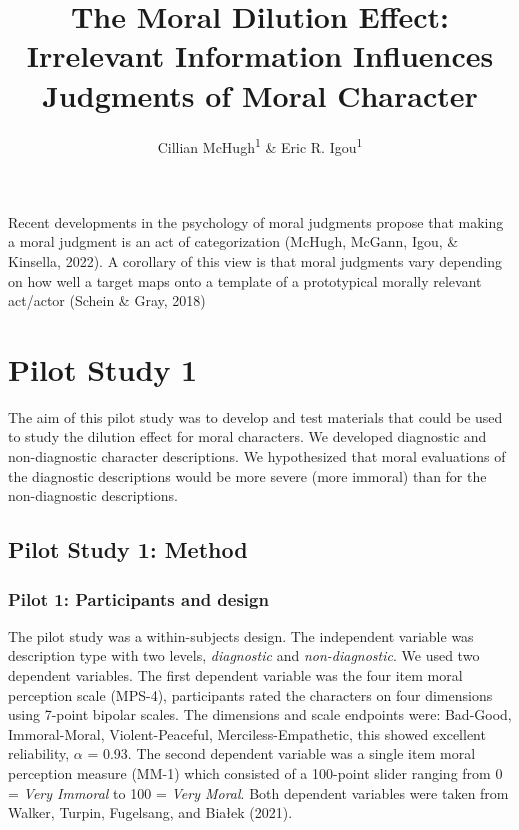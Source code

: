 \documentclass[
  american,
  man,floatsintext]{apa7}
\title{The Moral Dilution Effect: Irrelevant Information Influences Judgments of Moral Character}
\author{Cillian McHugh\textsuperscript{1} \& Eric R. Igou\textsuperscript{1}}
\date{}
\affiliation{\vspace{0.5cm}\textsuperscript{1} University of Limerick}
\begin{document}
\maketitle

Recent developments in the psychology of moral judgments propose that making a moral judgment is an act of categorization (McHugh, McGann, Igou, \& Kinsella, 2022). A corollary of this view is that moral judgments vary depending on how well a target maps onto a template of a prototypical morally relevant act/actor (Schein \& Gray, 2018)

\hypertarget{pilot-study-1}{%
\section{Pilot Study 1}\label{pilot-study-1}}

The aim of this pilot study was to develop and test materials that could be used to study the dilution effect for moral characters. We developed diagnostic and non-diagnostic character descriptions. We hypothesized that moral evaluations of the diagnostic descriptions would be more severe (more immoral) than for the non-diagnostic descriptions.

\hypertarget{pilot-study-1-method}{%
\subsection{Pilot Study 1: Method}\label{pilot-study-1-method}}

\hypertarget{pilot-1-participants-and-design}{%
\subsubsection{Pilot 1: Participants and design}\label{pilot-1-participants-and-design}}

The pilot study was a within-subjects design. The independent variable was description type with two levels, \emph{diagnostic} and \emph{non-diagnostic}. We used two dependent variables. The first dependent variable was the four item moral perception scale (MPS-4), participants rated the characters on four dimensions using 7-point bipolar scales. The dimensions and scale endpoints were: Bad-Good, Immoral-Moral, Violent-Peaceful, Merciless-Empathetic, this showed excellent reliability, \(\alpha\) = 0.93. The second dependent variable was a single item moral perception measure (MM-1) which consisted of a 100-point slider ranging from 0 = \emph{Very Immoral} to 100 = \emph{Very Moral}. Both dependent variables were taken from Walker, Turpin, Fugelsang, and Białek (2021).
\end{document}
